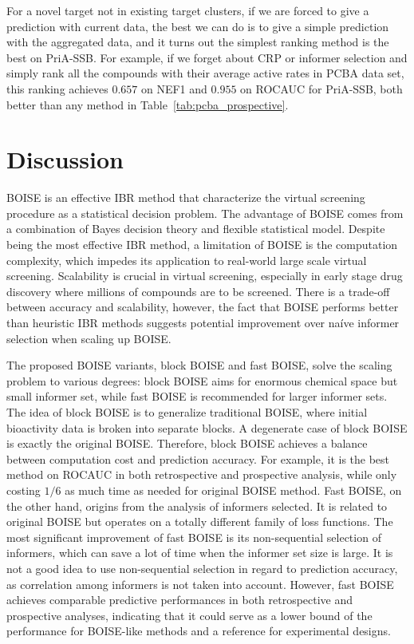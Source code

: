 \documentclass[11pt,a4paper]{article}
\theoremstyle{plain}
\begin{document}
For a novel target not in existing target clusters, if we are forced to give a prediction with current data, the best we can do is to give a simple prediction with the aggregated data, and it turns out the simplest ranking method is the best on PriA-SSB.
For example, if we forget about CRP or informer selection and simply rank all the compounds with their average active rates in PCBA data set, this ranking achieves $0.657$ on NEF1 and $0.955$ on ROCAUC for PriA-SSB, both better than any method in Table~\ref{tab:pcba_prospective}. 

\section{Discussion}
BOISE is an effective IBR method that characterize the virtual screening procedure as a statistical decision problem. The advantage of BOISE comes from a combination of Bayes decision theory and flexible statistical model. 
Despite being the most effective IBR method, a limitation of BOISE is the computation complexity, which impedes its application to real-world large scale virtual screening. Scalability is crucial in virtual screening, especially in early stage drug discovery where millions of compounds are to be screened. There is a trade-off between accuracy and scalability, however, the fact that BOISE performs better than heuristic IBR methods suggests potential improvement over na\'ive informer selection when scaling up BOISE. 

The proposed BOISE variants, block BOISE and fast BOISE, solve the scaling problem to various degrees: 
block BOISE aims for enormous chemical space but small informer set, while fast BOISE is recommended for larger informer sets. 
The idea of block BOISE is to generalize traditional BOISE, where initial bioactivity data is broken into separate blocks. A  degenerate case of block BOISE is exactly the original BOISE. Therefore, block BOISE achieves a balance between computation cost and prediction accuracy. For example, it is the best method on ROCAUC in both retrospective and prospective analysis, while only costing $1/6$ as much time as needed for original BOISE method. 
Fast BOISE, on the other hand, origins from the analysis of informers selected. It is related to original BOISE but operates on a totally different family of loss functions. 
The most significant improvement of fast BOISE is its non-sequential selection of informers, which can save a lot of time when the informer set size is large. It is not a good idea to use non-sequential selection in regard to prediction accuracy, as correlation among informers is not taken into account. 
However, fast BOISE achieves comparable predictive performances in both retrospective and prospective analyses, indicating that it could serve as a lower bound of the performance for BOISE-like methods and a reference for experimental designs. 
\end{document}
